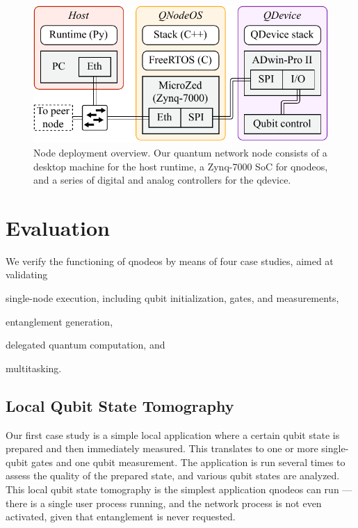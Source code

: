 \begin{figure}[t]
    \centering
    \includegraphics[width=0.6\linewidth]{figures/node-deployment.pdf}
    \caption{
        Node deployment overview. Our quantum network node consists of a desktop machine for the
        host runtime, a Zynq-7000 SoC for \acrshort{qnodeos}, and a series of digital and analog
        controllers for the \acrshort{qdevice}.
    }
    \label{fig:node-deployment}
\end{figure}

\section{Evaluation}
\label{sec:qnodeos:evaluation}

We verify the functioning of \acrshort{qnodeos} by means of four case studies, aimed at validating
\begin{inlinelist}
    \item single-node execution, including qubit initialization, gates, and measurements,
    \item entanglement generation,
    \item delegated quantum computation, and
    \item multitasking.
\end{inlinelist}

\subsection{Local Qubit State Tomography}

Our first case study is a simple local application where a certain qubit state is prepared and then
immediately measured. This translates to one or more single-qubit gates and one qubit measurement.
The application is run several times to assess the quality of the prepared state, and various qubit
states are analyzed. This local qubit state tomography is the simplest application
\acrshort{qnodeos} can run --- there is a single user process running, and the network process is
not even activated, given that entanglement is never requested.

